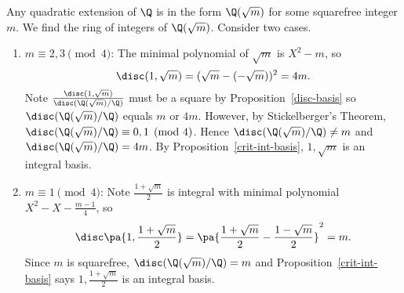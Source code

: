 \begin{ex}
Any quadratic extension of $\Q$ is in the form $\Q(\sqrt{m})$ for some squarefree integer $m$. We find the ring of integers of $\Q(\sqrt{m})$. Consider two cases.
\begin{enumerate}
\item $m\equiv 2,3\pmod 4$: The minimal polynomial of $\sqrt m$ is $X^2-m$, so
\[
\disc(1,\sqrt m)=(\sqrt m-(-\sqrt m))^2=4m.
\]
Note $\frac{\disc (1,\sqrt m)}{\disc(\Q(\sqrt m)/\Q)}$ must be a square by Proposition~\ref{disc-basis} so $\disc(\Q(\sqrt m)/\Q)$ equals $m$ or $4m$. 
However, by Stickelberger's Theorem, $\disc(\Q(\sqrt m)/\Q)\equiv 0,1\pmod 4$. Hence $\disc(\Q(\sqrt m)/\Q)\ne m$ and $\disc(\Q(\sqrt m)/\Q)=4m$. By Proposition~\ref{crit-int-basis}, $1,\sqrt m$ is an integral basis.
\item $m\equiv 1\pmod 4$: Note $\frac{1+\sqrt m}2$ is integral with minimal polynomial $X^2-X-\frac{m-1}{4}$, so
\[
\disc\pa{1,\frac{1+\sqrt m}2}=\pa{\frac{1+\sqrt m}2-\frac{1-\sqrt m}2}^2=m.
\]
Since $m$ is squarefree, $\disc(\Q(\sqrt m)/\Q)=m$ and Proposition~\ref{crit-int-basis} says $1,\frac{1+\sqrt m}2$ is an integral basis. 
\end{enumerate}
\end{ex}

